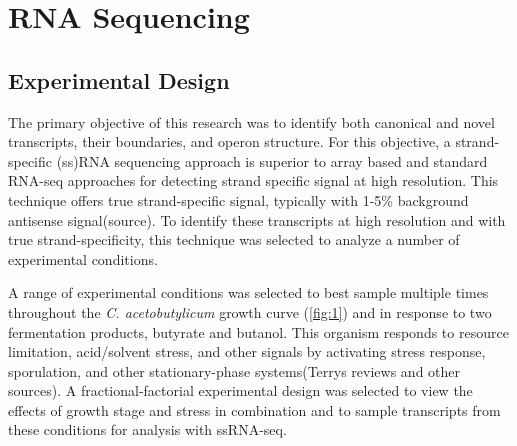 
\chapter{RNA Sequencing}
\section{Experimental Design}
The primary objective of this research was to identify both canonical and novel transcripts, their boundaries, and operon structure. For this objective, a strand-specific (ss)RNA sequencing approach is superior to array based and standard RNA-seq approaches for detecting strand specific signal at high resolution. This technique offers true strand-specific signal, typically with 1-5\% background antisense signal(source). To identify these transcripts at high resolution and with true strand-specificity, this technique was selected to analyze a number of experimental conditions.

A range of experimental conditions was selected to best sample multiple times throughout the \textit{C. acetobutylicum} growth curve (\ref{fig:1}) and in response to two fermentation products, butyrate and butanol. This organism responds to resource limitation, acid/solvent stress, and other signals by activating stress response, sporulation, and other stationary-phase systems(Terrys reviews and other sources). A fractional-factorial experimental design was selected to view the effects of growth stage and stress in combination and to sample transcripts from these conditions for analysis with ssRNA-seq. 

